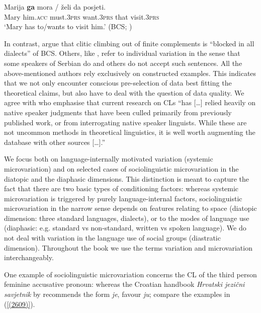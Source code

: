 \begin{exe}
\ex\label{(1.3)}
\gll Marija \textbf{ga} mora / želi da  posjeti. \\
Mary him.\textsc{acc} must.\textsc{3prs} {} want.\textsc{3prs} that visit.\textsc{3prs} \\
\glt `Mary has to/wants to visit him.'
\hfill (BCS; \citealt[174]{Stjepanovic04})
\end{exe}

\noindent In contrast, \citet[448]{CavarWilder94} argue that clitic climbing out of finite complements is ``blocked in all dialects'' of BCS. Others, like \citet[146]{Progovac05}, refer to individual variation in the sense that some speakers of Serbian do and others do not accept such sentences. All the above-mentioned authors rely exclusively on constructed examples. This indicates that we not only encounter conscious pre-selection of data best fitting the theoretical claims, but also have to deal with the question of data quality. We agree with \citet[60]{DFZ09} who emphasise that current research on CLs ``has [\dots] relied heavily on native speaker judgments that have been culled primarily from previously published work, or from interrogating native speaker linguists. While these are not uncommon methods in theoretical linguistics, it is well worth augmenting the database with other sources [\dots].''

We focus both on language-internally motivated variation (systemic microvariation) and on selected cases of sociolinguistic microvariation in the diatopic and the diaphasic dimensions. This distinction is meant to capture the fact that there are two basic types of conditioning factors: whereas systemic microvariation is triggered by purely language-internal factors, sociolinguistic microvariation in the narrow sense depends on features relating to space (diatopic dimension: three standard languages, dialects), or to the modes of language use (diaphasic: e.g. standard vs non-standard, written vs spoken language). We do not deal with variation in the language use of social groups (diastratic dimension). Throughout the book we use the terms variation and microvariation interchangeably.

One example of sociolinguistic microvariation concerns the CL of the third person feminine accusative pronoun: whereas the Croatian handbook \textit{Hrvatski jezični savjetnik} by \citet[173]{BHMV99} recommends the form \textit{je}, \citet[74]{HMBO14} favour \textit{ju}; compare the examples in (\ref{(2609)}). 

